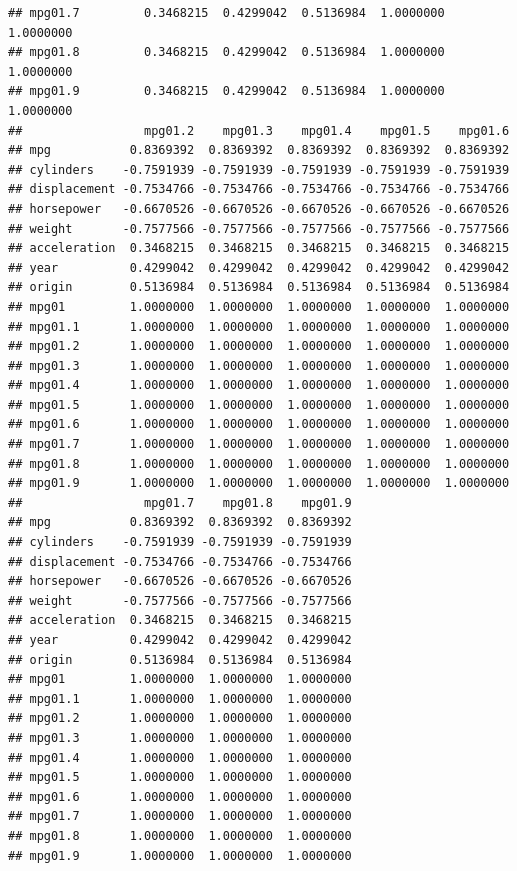 \documentclass[]{book}
\begin{document}
\begin{verbatim}
## mpg01.7         0.3468215  0.4299042  0.5136984  1.0000000  1.0000000
## mpg01.8         0.3468215  0.4299042  0.5136984  1.0000000  1.0000000
## mpg01.9         0.3468215  0.4299042  0.5136984  1.0000000  1.0000000
##                 mpg01.2    mpg01.3    mpg01.4    mpg01.5    mpg01.6
## mpg           0.8369392  0.8369392  0.8369392  0.8369392  0.8369392
## cylinders    -0.7591939 -0.7591939 -0.7591939 -0.7591939 -0.7591939
## displacement -0.7534766 -0.7534766 -0.7534766 -0.7534766 -0.7534766
## horsepower   -0.6670526 -0.6670526 -0.6670526 -0.6670526 -0.6670526
## weight       -0.7577566 -0.7577566 -0.7577566 -0.7577566 -0.7577566
## acceleration  0.3468215  0.3468215  0.3468215  0.3468215  0.3468215
## year          0.4299042  0.4299042  0.4299042  0.4299042  0.4299042
## origin        0.5136984  0.5136984  0.5136984  0.5136984  0.5136984
## mpg01         1.0000000  1.0000000  1.0000000  1.0000000  1.0000000
## mpg01.1       1.0000000  1.0000000  1.0000000  1.0000000  1.0000000
## mpg01.2       1.0000000  1.0000000  1.0000000  1.0000000  1.0000000
## mpg01.3       1.0000000  1.0000000  1.0000000  1.0000000  1.0000000
## mpg01.4       1.0000000  1.0000000  1.0000000  1.0000000  1.0000000
## mpg01.5       1.0000000  1.0000000  1.0000000  1.0000000  1.0000000
## mpg01.6       1.0000000  1.0000000  1.0000000  1.0000000  1.0000000
## mpg01.7       1.0000000  1.0000000  1.0000000  1.0000000  1.0000000
## mpg01.8       1.0000000  1.0000000  1.0000000  1.0000000  1.0000000
## mpg01.9       1.0000000  1.0000000  1.0000000  1.0000000  1.0000000
##                 mpg01.7    mpg01.8    mpg01.9
## mpg           0.8369392  0.8369392  0.8369392
## cylinders    -0.7591939 -0.7591939 -0.7591939
## displacement -0.7534766 -0.7534766 -0.7534766
## horsepower   -0.6670526 -0.6670526 -0.6670526
## weight       -0.7577566 -0.7577566 -0.7577566
## acceleration  0.3468215  0.3468215  0.3468215
## year          0.4299042  0.4299042  0.4299042
## origin        0.5136984  0.5136984  0.5136984
## mpg01         1.0000000  1.0000000  1.0000000
## mpg01.1       1.0000000  1.0000000  1.0000000
## mpg01.2       1.0000000  1.0000000  1.0000000
## mpg01.3       1.0000000  1.0000000  1.0000000
## mpg01.4       1.0000000  1.0000000  1.0000000
## mpg01.5       1.0000000  1.0000000  1.0000000
## mpg01.6       1.0000000  1.0000000  1.0000000
## mpg01.7       1.0000000  1.0000000  1.0000000
## mpg01.8       1.0000000  1.0000000  1.0000000
## mpg01.9       1.0000000  1.0000000  1.0000000
\end{verbatim}
\end{document}
